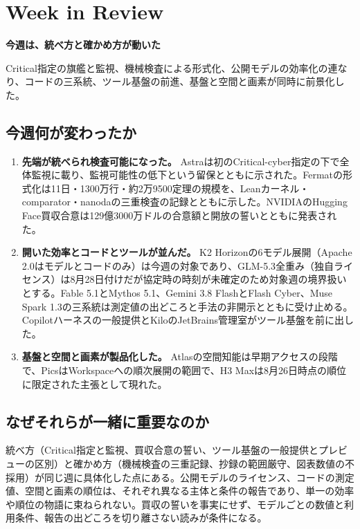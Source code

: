 \section{Week in Review}
\begin{wideflow}
{\Large\bfseries 今週は、統べ方と確かめ方が動いた}\par
\smallskip
{\color{SurveyMuted}Critical指定の旗艦と監視、機械検査による形式化、公開モデルの効率化の連なり、コードの三系統、ツール基盤の前進、基盤と空間と画素が同時に前景化した。}\par
\end{wideflow}

\subsection*{今週何が変わったか}
\begin{enumerate}[leftmargin=1.6em]
\item \textbf{先端が統べられ検査可能になった。} Astraは初のCritical-cyber指定の下で全体監視に載り、監視可能性の低下という留保とともに示された。Fermatの形式化は11日・1300万行・約2万9500定理の規模を、Leanカーネル・comparator・nanodaの三重検査の記録とともに示した。NVIDIAのHugging Face買収合意は129億3000万ドルの合意額と開放の誓いとともに発表された。
\item \textbf{開いた効率とコードとツールが並んだ。} K2 Horizonの6モデル展開（Apache 2.0はモデルとコードのみ）は今週の対象であり、GLM-5.3全重み（独自ライセンス）は8月28日付けだが協定時の時刻が未確定のため対象週の境界扱いとする。Fable 5.1とMythos 5.1、Gemini 3.8 FlashとFlash Cyber、Muse Spark 1.3の三系統は測定値の出どころと手法の非開示とともに受け止める。Copilotハーネスの一般提供とKiloのJetBrains管理室がツール基盤を前に出した。
\item \textbf{基盤と空間と画素が製品化した。} Atlasの空間知能は早期アクセスの段階で、PicsはWorkspaceへの順次展開の範囲で、H3 Maxは8月26日時点の順位に限定された主張として現れた。
\end{enumerate}

\subsection*{なぜそれらが一緒に重要なのか}
統べ方（Critical指定と監視、買収合意の誓い、ツール基盤の一般提供とプレビューの区別）と確かめ方（機械検査の三重記録、抄録の範囲厳守、図表数値の不採用）が同じ週に具体化した点にある。公開モデルのライセンス、コードの測定値、空間と画素の順位は、それぞれ異なる主体と条件の報告であり、単一の効率や順位の物語に束ねられない。買収の誓いを事実にせず、モデルごとの数値と利用条件、報告の出どころを切り離さない読みが条件になる。

